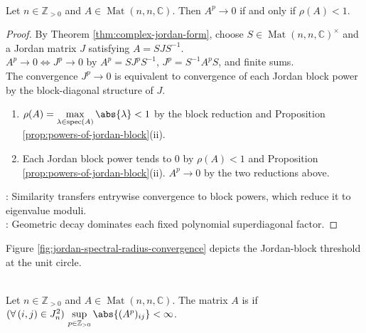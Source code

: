 \begin{theorem} \label{thm:matrix-powers-converge-to-zero-spectral-radius} \\
Let $n\in\mathbb{Z}_{>0}$ and $A\in\operatorname{Mat}(n,n,\mathbb{C})$. Then $A^p\to0$ if and only if $\rho(A)<1$.
\begin{proof}
By Theorem \ref{thm:complex-jordan-form}, choose $S\in\operatorname{Mat}(n,n,\mathbb{C})^\times$ and a Jordan matrix $J$ satisfying $A=SJS^{-1}$.\\
$A^p\to0\Longleftrightarrow J^p\to0$ by $A^p=SJ^pS^{-1}$, $J^p=S^{-1}A^pS$, and finite sums.\\
The convergence $J^p\to0$ is equivalent to convergence of each Jordan block power by the block-diagonal structure of $J$.
\begin{enumerate}[label=\roman*.]
\setlength{\itemsep}{0pt}
\item[$(\Rightarrow)$] $\rho(A)=\max\limits_{\lambda\in\operatorname{spec}(A)}\abs{\lambda}<1$ by the block reduction and Proposition \ref{prop:powers-of-jordan-block}(ii).
\item[$(\Leftarrow)$] Each Jordan block power tends to $0$ by $\rho(A)<1$ and Proposition \ref{prop:powers-of-jordan-block}(ii). $A^p\to0$ by the two reductions above.
\end{enumerate}
: Similarity transfers entrywise convergence to block powers, which reduce it to eigenvalue moduli.\\
: Geometric decay dominates each fixed polynomial superdiagonal factor.
\end{proof}
\end{theorem}

Figure \ref{fig:jordan-spectral-radius-convergence} depicts the Jordan-block threshold at the unit circle.

\begin{illustrationfigure}[H]
  \centering
  
  \caption{Jordan block powers decay for $\abs{\lambda}<1$, but not on or outside the gray unit circle.}
  \label{fig:jordan-spectral-radius-convergence}
\end{illustrationfigure}

\begin{definition} \label{def:power-bounded-matrix} \\
Let $n\in\mathbb{Z}_{>0}$ and $A\in\operatorname{Mat}(n,n,\mathbb{C})$. The matrix $A$ is  if $(\forall\,(i,j)\in J_n^2)\,\sup\limits_{p\in\mathbb{Z}_{>0}}\abs{(A^p)_{ij}}<\infty$.
\end{definition}

